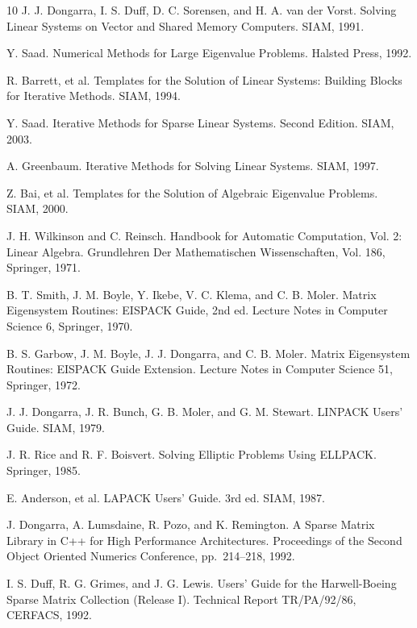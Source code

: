 \documentclass[a4paper]{jarticle}
\begin{document}
{{\begin{thebibliography}{10}
J. J. Dongarra, I. S. Duff, D. C. Sorensen, and H. A. van der Vorst.
\newblock Solving Linear Systems on Vector and Shared Memory Computers.
\newblock SIAM, 1991.

Y. Saad.
\newblock Numerical Methods for Large Eigenvalue Problems. 
\newblock Halsted Press, 1992.

R. Barrett, et al.
\newblock Templates for the Solution of Linear Systems: Building Blocks for Iterative Methods.
\newblock SIAM, 1994.

Y. Saad.
\newblock Iterative Methods for Sparse Linear Systems. Second Edition. 
\newblock SIAM, 2003.

A. Greenbaum.
\newblock Iterative Methods for Solving Linear Systems.
\newblock SIAM, 1997.

Z. Bai, et al.
\newblock Templates for the Solution of Algebraic Eigenvalue Problems. 
\newblock SIAM, 2000.

J. H. Wilkinson and C. Reinsch.
\newblock Handbook for Automatic Computation, Vol. 2: Linear Algebra.
\newblock Grundlehren Der Mathematischen Wissenschaften, Vol. 186, Springer, 1971.

B. T. Smith, J. M. Boyle, Y. Ikebe, V. C. Klema, and C. B. Moler.
\newblock Matrix Eigensystem Routines: EISPACK Guide, 2nd ed.
\newblock Lecture Notes in Computer Science 6, Springer, 1970.

B. S. Garbow, J. M. Boyle, J. J. Dongarra, and C. B. Moler.
\newblock Matrix Eigensystem Routines: EISPACK Guide Extension.
\newblock Lecture Notes in Computer Science 51, Springer, 1972.

J. J. Dongarra, J. R. Bunch, G. B. Moler, and G. M. Stewart.
\newblock LINPACK Users' Guide.
\newblock SIAM, 1979.

J. R. Rice and R. F. Boisvert.
\newblock Solving Elliptic Problems Using ELLPACK.
\newblock Springer, 1985.

E. Anderson, et al. 
\newblock LAPACK Users' Guide. 3rd ed.
\newblock SIAM, 1987.

J. Dongarra, A. Lumsdaine, R. Pozo, and K. Remington.
\newblock A Sparse Matrix Library in C++ for High Performance Architectures.
\newblock Proceedings of the Second Object Oriented Numerics Conference,
	pp.\ 214--218, 1992.

I. S. Duff, R. G. Grimes, and J. G. Lewis.
\newblock Users' Guide for the Harwell-Boeing Sparse Matrix Collection
(Release I).
\newblock Technical Report TR/PA/92/86, CERFACS, 1992.


\end{thebibliography}}}
\end{document}
